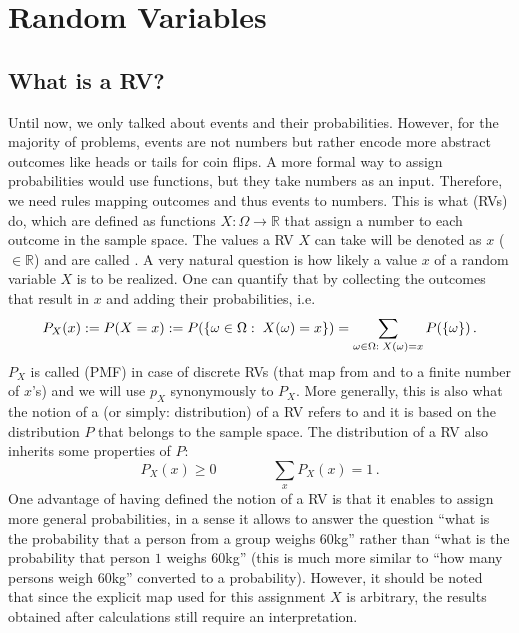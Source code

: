 \newpage



\section{Random Variables}
	\subsection{What is a RV?}
Until now, we only talked about events and their probabilities. However, for the majority of problems, events are not numbers but rather encode more abstract outcomes like heads or tails for coin flips. %
A more formal way to assign probabilities would use functions, but they take numbers as an input. Therefore, we need rules mapping outcomes and thus events to numbers.
This is what  (RVs) do, which are defined as functions $X: \Omega \rightarrow \mathbb{R}$ that assign a number to each outcome in the sample space. The values a RV $X$ can take will be denoted as $x$ ($\in \mathbb{R}$) and are called . A very natural question is how likely a value $x$ of a random variable $X$ is to be realized. One can quantify that by collecting the outcomes that result in $x$ and adding their probabilities, i.e.
\begin{equation}\label{eq:RV_distr}
P_X(x) := P(X = x) := P(\qty{\omega \in \Omega: \; X(\omega) = x}) = \sum_{\omega \in \Omega: \; X(\omega) = x} P(\qty{\omega}) \, .
\end{equation}
$P_X$ is called  (PMF) in case of discrete RVs (that map from and to a finite number of $x$'s) and we will use $p_X$ synonymously to $P_X$. More generally, this is also what the notion of a  (or simply: distribution) of a RV refers to and it is based on the distribution $P$ that belongs to the sample space. The distribution of a RV also inherits some properties of $P$:
\begin{equation}
P_X(x) \geq 0 \qquad \qquad \sum_x P_X(x) = 1 \, .
\end{equation}
One advantage of having defined the notion of a RV is that it enables to assign more general probabilities, in a sense it allows to answer the question \enquote{what is the probability that a person from a group weighs $60$kg} rather than \enquote{what is the probability that person $1$ weighs $60$kg} (this is much more similar to \enquote{how many persons weigh $60$kg} converted to a probability). However, it should be noted that since the explicit map used for this assignment $X$ is arbitrary, the results obtained after calculations still require an interpretation.

